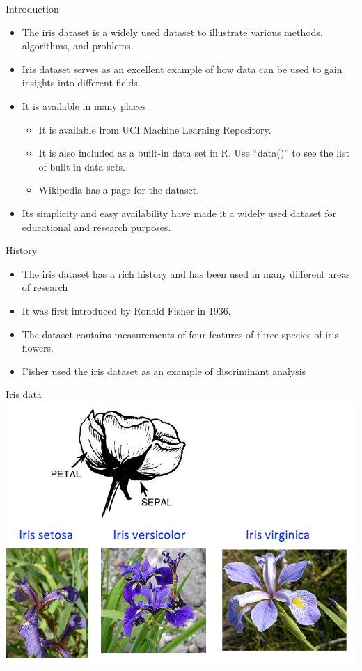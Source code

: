 \documentclass[
  ignorenonframetext,
]{beamer}
\providecommand{\tightlist}{%
  \setlength{\itemsep}{0pt}\setlength{\parskip}{0pt}}
\begin{document}
\begin{frame}{Introduction}
\protect\hypertarget{introduction}{}
\begin{itemize}
\tightlist
\item
  The iris dataset is a widely used dataset to illustrate various
  methods, algorithms, and problems.
\item
  Iris dataset serves as an excellent example of how data can be used to
  gain insights into different fields.
\item
  It is available in many places

  \begin{itemize}
  \tightlist
  \item
    It is available from UCI Machine Learning Repository.\\
  \item
    It is also included as a built-in data set in R. Use ``data()'' to
    see the list of built-in data sets.
  \item
    Wikipedia has a page for the dataset.\\
  \end{itemize}
\item
  Its simplicity and easy availability have made it a widely used
  dataset for educational and research purposes.
\end{itemize}
\end{frame}

\begin{frame}{History}
\protect\hypertarget{history}{}
\begin{itemize}
\tightlist
\item
  The iris dataset has a rich history and has been used in many
  different areas of research
\item
  It was first introduced by Ronald Fisher in 1936.
\item
  The dataset contains measurements of four features of three species of
  iris flowers.
\item
  Fisher used the iris dataset as an example of discriminant analysis
\end{itemize}
\end{frame}

\begin{frame}{Iris data}
\protect\hypertarget{iris-data-1}{}
\includegraphics[width=0.7\linewidth]{img/iris}
\end{frame}
\end{document}
